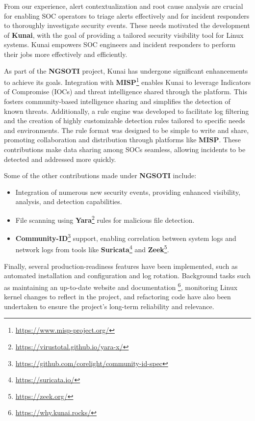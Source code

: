 From our experience, alert contextualization and root cause analysis are
crucial for enabling SOC operators to triage alerts effectively and for
incident responders to thoroughly investigate security events. These needs
motivated the development of \textbf{Kunai}, with the goal of providing a
tailored security visibility tool for Linux systems. Kunai empowers SOC
engineers and incident responders to perform their jobs more effectively and
efficiently.

As part of the \textbf{NGSOTI} project, Kunai has undergone significant
enhancements to achieve its goals. Integration with
\textbf{MISP}\footnote{\href{https://www.misp-project.org/}{https://www.misp-project.org/}}
enables Kunai to leverage Indicators of Compromise (IOCs) and threat intelligence
shared through the platform. This fosters community-based intelligence sharing
and simplifies the detection of known threats. Additionally, a rule engine was
developed to facilitate log filtering and the creation of highly customizable
detection rules tailored to specific needs and environments. The rule format was
designed to be simple to write and share, promoting collaboration and distribution
through platforms like \textbf{MISP}. These contributions make data sharing
among SOCs seamless, allowing incidents to be detected and addressed more quickly.

Some of the other contributions made under \textbf{NGSOTI} include:
\begin{itemize}
	\item Integration of numerous new security events, providing enhanced
visibility, analysis, and detection capabilities.
	\item File scanning using
\textbf{Yara}\footnote{\href{https://virustotal.github.io/yara-x/}{https://virustotal.github.io/yara-x/}}
rules for malicious file detection.
	\item \textbf{Community-ID}\footnote{\href{https://github.com/corelight/community-id-spec}{https://github.com/corelight/community-id-spec}}
support, enabling correlation between system logs and network logs from tools
like \textbf{Suricata}\footnote{\href{https://suricata.io/}{https://suricata.io/}}
and \textbf{Zeek}\footnote{\href{https://zeek.org/}{https://zeek.org/}}.
\end{itemize}

Finally, several production-readiness features have been implemented, such as
automated installation and configuration and log rotation. Background tasks
such as maintaining an up-to-date website and documentation
\footnote{\href{https://why.kunai.rocks/}{https://why.kunai.rocks/}},
monitoring Linux kernel changes to reflect in the project, and refactoring
code have also been undertaken to ensure the project's long-term reliability
and relevance.



